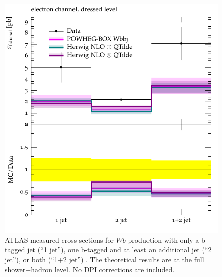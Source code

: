 \documentclass[11pt]{cernrep}
\begin{document}
\begin{figure}[htbp]
\begin{center}
   \includegraphics[scale=0.65]{figs/wbb/compared/d01-x01-y01.pdf}
\end{center}
\caption{ATLAS measured cross sections for $Wb$ production with only a
  b-tagged jet (``1 jet''), one b-tagged and at least an additional
  jet (``2 jet''), or both (``1+2 jet'') .  The theoretical results
  are at the full shower+hadron level. No DPI corrections are
  included. }
\label{fig:wbb-njet}
\end{figure}
\end{document}
